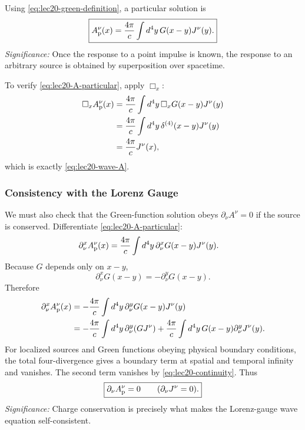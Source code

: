 Using \eqref{eq:lec20-green-definition}, a particular solution is
\begin{equation}\label{eq:lec20-A-particular}
  \boxed{A^\nu_{\rm p}(x)=\frac{4\pi}{c}\int d^4y\,G(x-y)J^\nu(y).}
\end{equation}
\textit{Significance:} Once the response to a point impulse is known, the response to an arbitrary source is obtained by superposition over spacetime.

To verify \eqref{eq:lec20-A-particular}, apply $\Box_x$:
\begin{align*}
  \Box_x A^\nu_{\rm p}(x)
  &=\frac{4\pi}{c}\int d^4y\,\Box_xG(x-y)J^\nu(y) \\
  &=\frac{4\pi}{c}\int d^4y\,\delta^{(4)}(x-y)J^\nu(y) \\
  &=\frac{4\pi}{c}J^\nu(x),
\end{align*}
which is exactly \eqref{eq:lec20-wave-A}.

\subsubsection*{Consistency with the Lorenz Gauge}
We must also check that the Green-function solution obeys $\partial_\nu A^\nu=0$ if the
source is conserved. Differentiate \eqref{eq:lec20-A-particular}:
\begin{align*}
  \partial^x_\nu A^\nu_{\rm p}(x)
  &=\frac{4\pi}{c}\int d^4y\,\partial^x_\nu G(x-y)J^\nu(y).
\end{align*}
Because $G$ depends only on $x-y$,
\begin{equation*}
  \partial^x_\nu G(x-y)=-\partial^y_\nu G(x-y).
\end{equation*}
Therefore
\begin{align*}
  \partial^x_\nu A^\nu_{\rm p}(x)
  &=-\frac{4\pi}{c}\int d^4y\,\partial^y_\nu G(x-y)J^\nu(y) \\
  &=-\frac{4\pi}{c}\int d^4y\,\partial^y_\nu\qty(GJ^\nu)
    +\frac{4\pi}{c}\int d^4y\,G(x-y)\partial^y_\nu J^\nu(y).
\end{align*}
For localized sources and Green functions obeying physical boundary conditions, the total
four-divergence gives a boundary term at spatial and temporal infinity and vanishes. The
second term vanishes by \eqref{eq:lec20-continuity}. Thus
\begin{equation}\label{eq:lec20-lorenz-preserved}
  \boxed{\partial_\nu A^\nu_{\rm p}=0\qquad(\partial_\nu J^\nu=0).}
\end{equation}
\textit{Significance:} Charge conservation is precisely what makes the Lorenz-gauge wave equation self-consistent.

